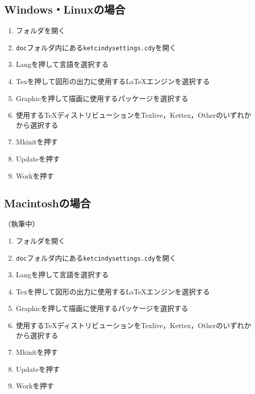 \subsection{Windows・Linuxの場合}
\begin{enumerate}
    \item {\ketcindy}フォルダを開く
    \item \verb|doc|フォルダ内にある\verb|ketcindysettings.cdy|を開く
    \item Langを押して言語を選択する
    \item Texを押して図形の出力に使用する{\LaTeX}エンジンを選択する
    \item Graphicを押して描画に使用するパッケージを選択する
    \item 使用する{\TeX}ディストリビューションをTexlive，Kettex，Otherのいずれかから選択する
    \item Mkinitを押す
    \item Updateを押す
    \item Workを押す
\end{enumerate}

\subsection{Macintoshの場合}
（執筆中）
\begin{enumerate}
    \item {\ketcindy}フォルダを開く
    \item \verb|doc|フォルダ内にある\verb|ketcindysettings.cdy|を開く
    \item Langを押して言語を選択する
    \item Texを押して図形の出力に使用する{\LaTeX}エンジンを選択する
    \item Graphicを押して描画に使用するパッケージを選択する
    \item 使用する{\TeX}ディストリビューションをTexlive，Kettex，Otherのいずれかから選択する
    \item Mkinitを押す
    \item Updateを押す
    \item Workを押す
\end{enumerate}
